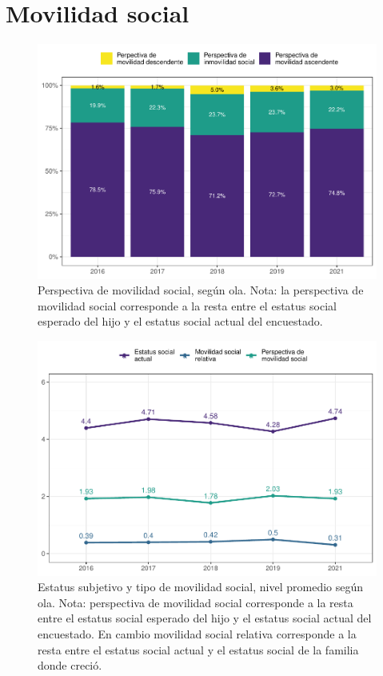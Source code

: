 \documentclass[
  12pt,
  openany]{book}
\begin{document}
\hypertarget{movilidad-social}{%
\section{Movilidad social}\label{movilidad-social}}

\begin{figure}

{\centering \includegraphics{reporte-elsoc_files/figure-latex/mov-soc-rec-1} 

}

\caption{Perspectiva de movilidad social, según ola.
Nota: la perspectiva de movilidad social corresponde a la resta entre el estatus social esperado del hijo y el estatus social actual del encuestado.}\label{fig:mov-soc-rec}
\end{figure}

\begin{figure}

{\centering \includegraphics{reporte-elsoc_files/figure-latex/mov-soc-1} 

}

\caption{Estatus subjetivo y tipo de movilidad social, nivel promedio según ola.
Nota: perspectiva de movilidad social corresponde a la resta entre el estatus social esperado del hijo y el estatus social actual del encuestado. En cambio movilidad social relativa corresponde a la resta entre el estatus social actual y el estatus social de la familia donde creció.}\label{fig:mov-soc}
\end{figure}
\end{document}
